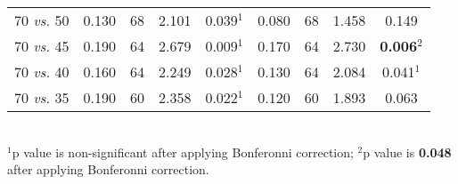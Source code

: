 \documentclass[12pt,letterpaper]{article}
\begin{document}
\begin{table}[ht]
\begin{tabular}{c|cccc|cccc}
  70 \textit{vs.} 50 & 0.130 & 68 & 2.101 & 0.039$^1$ & 0.080 & 68 & 1.458 & 0.149 \\ 
  70 \textit{vs.} 45 & 0.190 & 64 & 2.679 & 0.009$^1$ & 0.170 & 64 & 2.730 & \textbf{0.006}$^2$ \\ 
  70 \textit{vs.} 40 & 0.160 & 64 & 2.249 & 0.028$^1$ & 0.130 & 64 & 2.084 & 0.041$^1$ \\ 
  70 \textit{vs.} 35 & 0.190 & 60 & 2.358 & 0.022$^1$ & 0.120 & 60 & 1.893 & 0.063 \\ 
   \hline
\end{tabular} \\
   \small{$^1$p value is non-significant after applying Bonferonni correction;
   $^2$p value is \textbf{0.048} after applying Bonferonni correction.}
\end{table}
\end{document}
